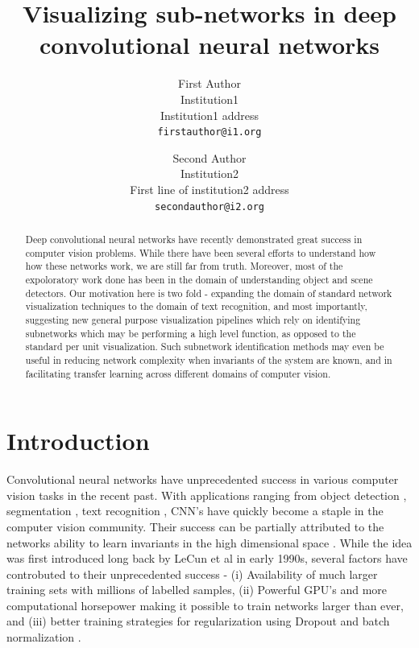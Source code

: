 \documentclass[10pt,twocolumn,letterpaper]{article}
\begin{document}
\title{Visualizing sub-networks in deep convolutional neural networks}

\author{First Author\\
Institution1\\
Institution1 address\\
{\tt\small firstauthor@i1.org}
\and
Second Author\\
Institution2\\
First line of institution2 address\\
{\tt\small secondauthor@i2.org}
}

\maketitle

\begin{abstract}
   Deep convolutional neural networks have recently demonstrated great success in computer vision problems. While there have been several efforts to understand how how these networks work, we are still far from truth. Moreover, most of the expoloratory work done has been in the domain of understanding object and scene detectors. Our motivation here is two fold - expanding the domain of standard network visualization techniques to the domain of text recognition, and most importantly, suggesting new general purpose visualization pipelines which rely on identifying subnetworks which may be performing a high level function, as opposed to the standard per unit visualization. Such subnetwork identification methods may even be useful in reducing network complexity when invariants of the system are known, and in facilitating transfer learning across different domains of computer vision. 
\end{abstract}

\section{Introduction}
Convolutional neural networks have unprecedented success in various computer vision tasks in the recent past.  With applications ranging from object detection \cite{}, segmentation \cite{}, text recognition \cite{}, CNN's have quickly become a staple in the computer vision community. Their success can be partially attributed to the networks ability to learn invariants in the high dimensional space \cite{}. While the idea was first introduced long back by LeCun et al in early 1990s, several factors have controbuted to their unprecedented success - (i) Availability of much larger training sets with millions of labelled samples, (ii) Powerful GPU's and more computational horsepower making it possible to train networks larger than ever, and (iii) better training strategies for regularization using Dropout \cite{wan2013regularization} and batch normalization \cite{ioffe2015batch}.
\end{document}
